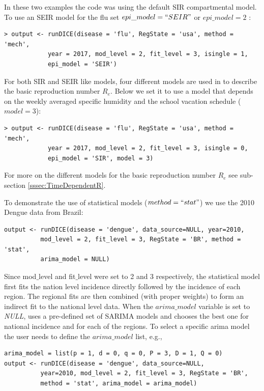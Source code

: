 \documentclass[a4paper]{article}
\begin{document}
In these two examples the  code was using the default SIR compartmental model.  To use an SEIR model for the flu set $epi\_model = ``SEIR"$ or $epi\_model = 2$ :

\begin{verbatim}
> output <- runDICE(disease = 'flu', RegState = 'usa', method = 'mech',
            year = 2017, mod_level = 2, fit_level = 3, isingle = 1,
            epi_model = 'SEIR')
\end{verbatim}

For both SIR and SEIR like models, four different models are used in  to describe the basic reproduction number $R_e$. Below we set it to use a model that depends on the weekly averaged specific humidity and the school vacation schedule ($model=3$):
\begin{verbatim}
> output <- runDICE(disease = 'flu', RegState = 'usa', method = 'mech',
            year = 2017, mod_level = 2, fit_level = 3, isingle = 0,
            epi_model = 'SIR', model = 3)
\end{verbatim}
For more on the different models for the basic reproduction number $R_e$ see sub-section \ref{sssec:TimeDependentR}.

To demonstrate the use of statistical models ($method = ``stat"$) we use the 2010 Dengue data from Brazil:

\begin{verbatim}
output <- runDICE(disease = 'dengue', data_source=NULL, year=2010,
          mod_level = 2, fit_level = 3, RegState = 'BR', method = 'stat',
          arima_model = NULL)
\end{verbatim}


Since mod$\_$level and fit$\_$level were set to 2 and 3 respectively, the statistical model first fits the nation level incidence directly followed by the incidence of each region. The regional fits are then combined (with proper weights) to form an indirect fit to the national level data. When the $arima\_model$ variable is set to \emph{NULL},  uses a pre-defined set of SARIMA models and chooses the best one for national incidence and for each of the regions.
To select a specific arima model the user needs to define the $arima\_model$ list, e.g.,

\begin{verbatim}
arima_model = list(p = 1, d = 0, q = 0, P = 3, D = 1, Q = 0)
output <- runDICE(disease = 'dengue', data_source=NULL,
          year=2010, mod_level = 2, fit_level = 3, RegState = 'BR',
          method = 'stat', arima_model = arima_model)
\end{verbatim}
\end{document}
